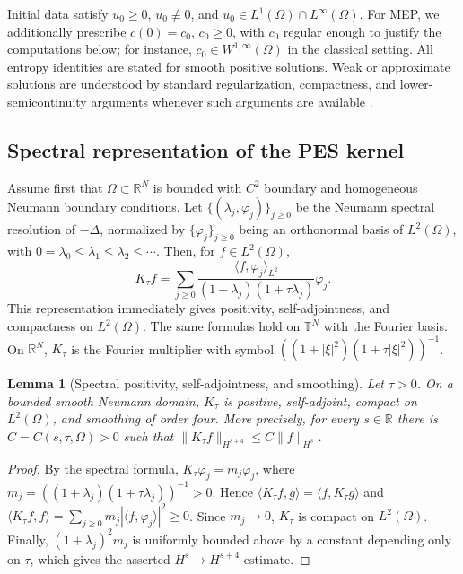 \documentclass[pdflatex,sn-mathphys-num]{sn-jnl}%
\theoremstyle{thmstyleone}
\newtheorem{lemma}[theorem]{Lemma}
\theoremstyle{thmstyletwo}
\theoremstyle{thmstylethree}
\begin{document}
Initial data satisfy \(u_0\ge0\), \(u_0\not\equiv0\), and \(u_0\in L^1(\Omega)\cap L^\infty(\Omega)\).  For MEP, we additionally prescribe \(c(0)=c_0\), \(c_0\ge0\), with \(c_0\) regular enough to justify the computations below; for instance, \(c_0\in W^{1,\infty}(\Omega)\) in the classical setting.  All entropy identities are stated for smooth positive solutions.  Weak or approximate solutions are understood by standard regularization, compactness, and lower-semicontinuity arguments whenever such arguments are available \cite{ladyzhenskaia1968linear,amann1995linear,simon1986compact}.

\subsection{Spectral representation of the PES kernel}

Assume first that \(\Omega\subset\mathbb R^N\) is bounded with \(C^2\)
boundary and homogeneous Neumann boundary conditions.  Let
\(\{(\lambda_j,\varphi_j)\}_{j\ge0}\) be the Neumann spectral resolution of
\(-\Delta\), normalized by \(\{\varphi_j\}_{j\ge0}\) being an orthonormal basis
of \(L^2(\Omega)\), with \(0=\lambda_0\le\lambda_1\le\lambda_2\le\cdots\).
Then, for \(f\in L^2(\Omega)\),
\[
        K_\tau f
        =
        \sum_{j\ge0}
        \frac{\langle f,\varphi_j\rangle_{L^2}}
        {(1+\lambda_j)(1+\tau\lambda_j)}
        \varphi_j .
\]
This representation immediately gives positivity, self-adjointness, and
compactness on \(L^2(\Omega)\).  The same formulas hold on \(\mathbb T^N\)
with the Fourier basis.  On \(\mathbb R^N\), \(K_\tau\) is the Fourier
multiplier with symbol \(((1+|\xi|^2)(1+\tau|\xi|^2))^{-1}\).

\begin{lemma}[Spectral positivity, self-adjointness, and smoothing]
\label{lem:spectral-positivity}
Let \(\tau>0\).  On a bounded smooth Neumann domain, \(K_\tau\) is positive,
self-adjoint, compact on \(L^2(\Omega)\), and smoothing of order four.  More
precisely, for every \(s\in\mathbb R\) there is \(C=C(s,\tau,\Omega)>0\) such
that \(\|K_\tau f\|_{H^{s+4}}\le C\|f\|_{H^s}\).
\end{lemma}

\begin{proof}
By the spectral formula, \(K_\tau\varphi_j=m_j\varphi_j\), where
\(m_j=((1+\lambda_j)(1+\tau\lambda_j))^{-1}>0\).  Hence
\(\langle K_\tau f,g\rangle=\langle f,K_\tau g\rangle\) and
\(\langle K_\tau f,f\rangle=\sum_{j\ge0}m_j|\langle f,\varphi_j\rangle|^2\ge0\).
Since \(m_j\to0\), \(K_\tau\) is compact on \(L^2(\Omega)\).  Finally,
\((1+\lambda_j)^2m_j\) is uniformly bounded above by a constant depending only
on \(\tau\), which gives the asserted \(H^s\to H^{s+4}\) estimate.
\end{proof}
\end{document}
